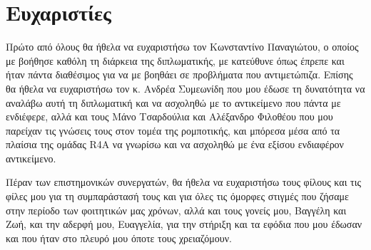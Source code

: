 \section*{Ευχαριστίες}
{}

Πρώτο από όλους θα ήθελα να ευχαριστήσω τον Κωνσταντίνο Παναγιώτου, ο οποίος με βοήθησε καθόλη τη διάρκεια της διπλωματικής, με κατεύθυνε όπως έπρεπε και ήταν πάντα διαθέσιμος για να με βοηθάει σε προβλήματα που αντιμετώπιζα. Επίσης θα ήθελα να ευχαριστήσω τον κ. Ανδρέα Συμεωνίδη που μου έδωσε τη δυνατότητα να αναλάβω αυτή τη διπλωματική και να ασχοληθώ με το αντικείμενο που πάντα με ενδιέφερε, αλλά και τους Μάνο Τσαρδούλια και Αλέξανδρο Φιλοθέου που μου παρείχαν τις γνώσεις τους στον τομέα της ρομποτικής, και μπόρεσα μέσα από τα πλαίσια της ομάδας R4A να γνωρίσω και να ασχοληθώ με ένα εξίσου ενδιαφέρον αντικείμενο.

Πέραν των επιστημονικών συνεργατών, θα ήθελα να ευχαριστήσω τους φίλους και τις φίλες μου για τη συμπαράστασή τους και για όλες τις όμορφες στιγμές που ζήσαμε στην περίοδο των φοιτητικών μας χρόνων, αλλά και τους γονείς μου, Βαγγέλη και Ζωή, και την αδερφή μου, Ευαγγελία, για την στήριξη και τα εφόδια που μου έδωσαν και που ήταν στο πλευρό μου όποτε τους χρειαζόμουν.